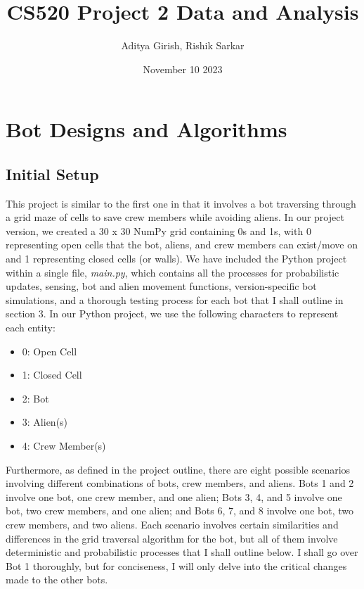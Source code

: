 \documentclass[11pt]{article}
\title{CS520 Project 2 Data and Analysis}
\author{Aditya Girish, Rishik Sarkar}
\date{November 10 2023}
\begin{document}
\maketitle

\section{Bot Designs and Algorithms}

\subsection{Initial Setup}

This project is similar to the first one in that it involves a bot traversing through a grid maze of cells to save crew members while avoiding aliens. In our project version, we created a 30 x 30 NumPy grid containing 0s and 1s, with 0 representing open cells that the bot, aliens, and crew members can exist/move on and 1 representing closed cells (or walls). We have included the Python project within a single file, \emph{main.py}, which contains all the processes for probabilistic updates, sensing, bot and alien movement functions, version-specific bot simulations, and a thorough testing process for each bot that I shall outline in section 3. In our Python project, we use the following characters to represent each entity:

\begin{itemize}
    \item 0: Open Cell
    \item 1: Closed Cell
    \item 2: Bot
    \item 3: Alien(s)
    \item 4: Crew Member(s)
\end{itemize}

Furthermore, as defined in the project outline, there are eight possible scenarios involving different combinations of bots, crew members, and aliens. Bots 1 and 2 involve one bot, one crew member, and one alien; Bots 3, 4, and 5 involve one bot, two crew members, and one alien; and Bots 6, 7, and 8 involve one bot, two crew members, and two aliens. Each scenario involves certain similarities and differences in the grid traversal algorithm for the bot, but all of them involve deterministic and probabilistic processes that I shall outline below. I shall go over Bot 1 thoroughly, but for conciseness, I will only delve into the critical changes made to the other bots.
\end{document}
